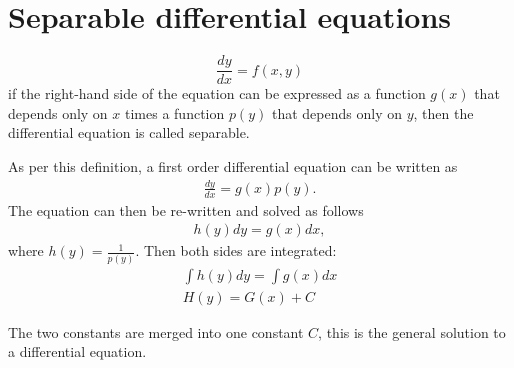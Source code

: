 \section{Separable differential equations} \label{SDE}
\begin{tcolorbox}[colback=blue!5!white,colframe=blue!75!black,title=Definition: Separable equation] 
    $$\frac{dy}{dx} = f(x,y)$$
    if the right-hand side of the equation can be expressed as   a function $g(x)$ that depends only on $x$ times a function $p(y)$ that depends only on $y$, then the differential equation is called separable.
   \end{tcolorbox}
As per this definition, a first order differential equation can be written as
\begin{align}
	\frac{dy}{dx}=g(x)p(y).
\end{align}
The equation can then be re-written and solved as follows
\begin{align}
	h(y)dy=g(x)dx,
\end{align}
where $h(y) = \frac{1}{p(y)}$. Then both sides are integrated:
 \begin{align}
 	\int h(y)dy =\int g(x)dx   \\
 	H(y)=G(x)+C
 \end{align}
 
The two constants are merged into one constant $C$, this is the general solution to a differential equation. \citep{diffandcomplex}

